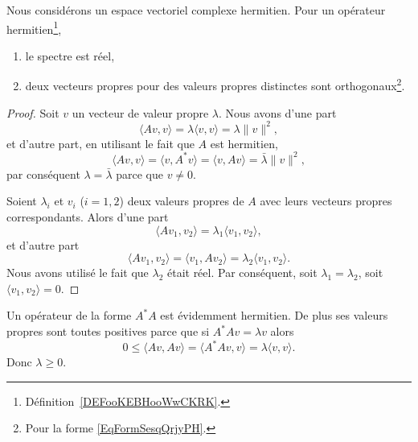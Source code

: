 \begin{lemma}      \label{LEMooVCEOooIXnTpp}
	Nous considérons un espace vectoriel complexe hermitien. Pour un opérateur hermitien\footnote{Définition~\ref{DEFooKEBHooWwCKRK}.},
	\begin{enumerate}
		\item
		      le spectre est réel,
		\item
		      deux vecteurs propres pour des valeurs propres distinctes sont orthogonaux\footnote{Pour la forme \eqref{EqFormSesqQrjyPH}.}.
	\end{enumerate}
\end{lemma}

\begin{proof}
	Soit \( v\) un vecteur de valeur propre \( \lambda\). Nous avons d'une part
	\begin{equation}
		\langle Av, v\rangle =\lambda\langle v, v\rangle =\lambda\| v \|^2,
	\end{equation}
	et d'autre part, en utilisant le fait que \( A\) est hermitien,
	\begin{equation}
		\langle Av, v\rangle =\langle v, A^*v\rangle =\langle v, Av\rangle =\bar\lambda\| v \|^2,
	\end{equation}
	par conséquent \( \lambda=\bar\lambda\) parce que \( v\neq 0\).

	Soient \( \lambda_i\) et \( v_i\) (\( i=1,2\)) deux valeurs propres de \( A\) avec leurs vecteurs propres correspondants. Alors d'une part
	\begin{equation}
		\langle Av_1, v_2\rangle =\lambda_1\langle v_1, v_2\rangle ,
	\end{equation}
	et d'autre part
	\begin{equation}
		\langle Av_1, v_2\rangle =\langle v_1, Av_2\rangle =\lambda_2\langle v_1, v_2\rangle .
	\end{equation}
	Nous avons utilisé le fait que \( \lambda_2\) était réel. Par conséquent, soit \( \lambda_1=\lambda_2\), soit \( \langle v_1, v_2\rangle =0\).
\end{proof}

\begin{remark}      \label{REMooMLBCooTuKFmz}
	Un opérateur de la forme \( A^*A\) est évidemment hermitien. De plus ses valeurs propres sont toutes positives parce que si \( A^*Av=\lambda v\) alors
	\begin{equation}
		0\leq \langle Av, Av\rangle =\langle A^*Av, v\rangle =\lambda\langle v, v\rangle .
	\end{equation}
	Donc \( \lambda\geq 0\).
\end{remark}

